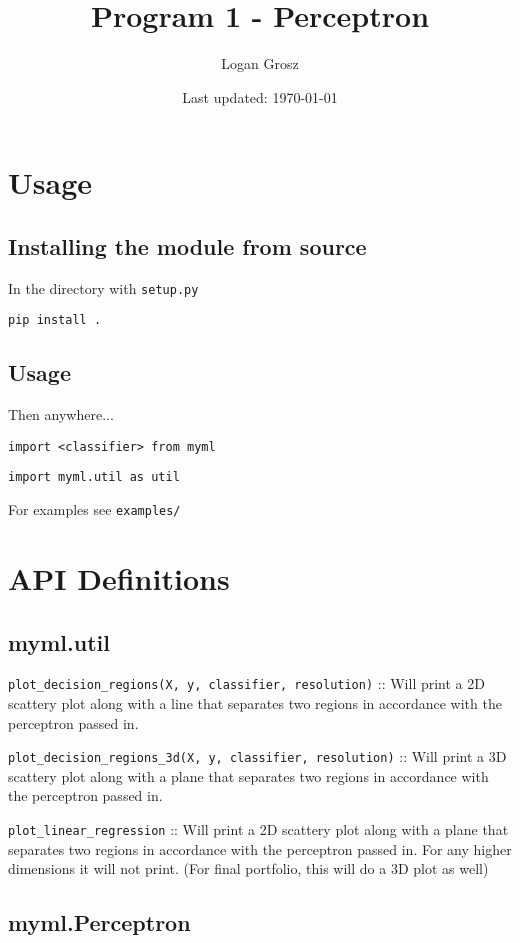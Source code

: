 \documentclass{article}
\title{Program 1 - Perceptron}
\author{Logan Grosz}
\date{Last updated: \today}
\begin{document}
\maketitle

\section{Usage}

\subsection{Installing the module from source}

In the directory with \texttt{setup.py}

\texttt{pip install .}

\subsection{Usage}

Then anywhere...

\texttt{import <classifier> from myml}

\texttt{import myml.util as util}

For examples see \texttt{examples/}

\section{API Definitions}

\subsection{myml.util}

\texttt{plot\_decision\_regions(X, y, classifier, resolution)} :: Will print a 2D scattery plot along with a
line that separates two regions in accordance with the perceptron passed in.

\texttt{plot\_decision\_regions\_3d(X, y, classifier, resolution)} :: Will print a 3D scattery plot along with a
plane that separates two regions in accordance with the perceptron passed in.

\texttt{plot\_linear\_regression} :: Will print a 2D scattery plot along with a
plane that separates two regions in accordance with the perceptron passed in. For any higher dimensions it will not print. (For final portfolio, this will do a 3D plot as well)

\subsection{myml.Perceptron}
\end{document}

